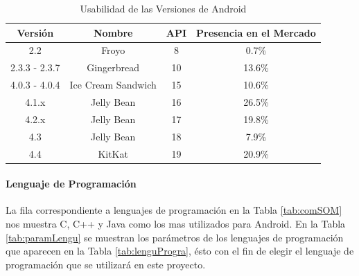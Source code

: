 \begin{table} 
	\begin{center}
		\begin{tabular}{|c|c|c|c|}
			\hline \rowcolor[RGB]{51,153,255} 
			\textcolor{blanco}{\bf Versión} &
				\textcolor{blanco}{\bf Nombre} &
				\textcolor{blanco}{\bf API} &
				\textcolor{blanco}{\bf Presencia en el Mercado} \\
			\hline  
				2.2 &
				Froyo &
				8 &
				0.7\% \\
      		\hline \rowcolor[RGB]{240,248,255}
      			2.3.3 - 2.3.7 &
				Gingerbread &
				10 &
				13.6\% \\
      		\hline 
      			4.0.3 - 4.0.4 &
				Ice Cream Sandwich &
				15 &
				10.6\% \\
      		\hline \rowcolor[RGB]{240,248,255}
      			4.1.x &
				Jelly Bean &
				16 &
				26.5\% \\
      		\hline 
      			4.2.x &
				Jelly Bean &
				17 &
				19.8\% \\
      		\hline \rowcolor[RGB]{240,248,255}
      			4.3 &
				Jelly Bean &
				18 &
				7.9\% \\
      		\hline 
      			4.4 &
				KitKat &
				19 &
				20.9\% \\
      		\hline 
		\end{tabular}
	\end{center}
	\caption[Usabilidad de las Versiones de Android]{Usabilidad de las Versiones de Android \cite{devAndroid}} 
	\label{tab:versionesTabla}
\end{table}

\paragraph{Lenguaje de Programación}

La fila correspondiente a lenguajes de programación en la Tabla \ref{tab:comSOM} nos muestra C, C++ y Java como los mas utilizados para Android. En la Tabla \ref{tab:paramLengu} se muestran los parámetros de los lenguajes de programación que aparecen en la Tabla \ref{tab:lenguProgra}, ésto con el fin de elegir el lenguaje de programación que se utilizará en este proyecto. 

